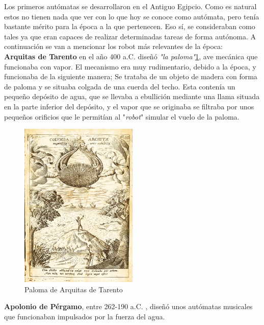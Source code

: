 Los primeros autómatas se desarrollaron en el Antiguo Egipcio. Como es natural estos no tienen nada que ver con lo que hoy se conoce como autómata, pero tenía bastante mérito para la época a la que pertenecen. Eso sí, se consideraban como tales ya que eran capaces de realizar determinadas tareas de forma autónoma. A continuación se van a mencionar los robot más relevantes de la época:\\

 \textbf{Arquitas de Tarento} en el año 400 a.C. diseñó \textit{"la paloma"}\ref{paloma}, ave mecánica que funcionaba con vapor. El mecanismo era muy rudimentario, debido a la época, y funcionaba de la siguiente manera; Se trataba de un objeto de madera con forma de paloma y se situaba colgada de una cuerda del techo. Esta contenía un pequeño depósito de agua, que se llevaba a ebullición mediante una llama situada en la parte inferior del depósito, y el vapor que se originaba se filtraba por unos pequeños orificios que le permitían al "\textit{robot}" simular el vuelo de la paloma.\\
 
\begin{figure}[H]
\begin{center}
  \includegraphics[width=0.5\textwidth]{./EtapaPrimeriza/imagenes/paloma.jpg}
  \caption{Paloma de Arquitas de Tarento}
  \label{paloma}
\end{center}
\end{figure}


\textbf{Apolonio de Pérgamo}, entre 262-190 a.C. , diseñó unos autómatas musicales que funcionaban impulsados por la fuerza del agua.\\


